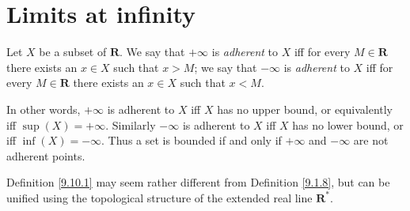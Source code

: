 \section{Limits at infinity}\label{sec 9.10}

\begin{definition}\label{9.10.1}
    Let \(X\) be a subset of \(\mathbf{R}\).
    We say that \(+\infty\) is \emph{adherent} to \(X\) iff for every \(M \in \mathbf{R}\) there exists an \(x \in X\) such that \(x > M\);
    we say that \(-\infty\) is \emph{adherent} to \(X\) iff for every \(M \in \mathbf{R}\) there exists an \(x \in X\) such that \(x < M\).
\end{definition}

\begin{note}
    In other words, \(+\infty\) is adherent to \(X\) iff \(X\) has no upper bound, or equivalently iff \(\sup(X) = +\infty\).
    Similarly \(-\infty\) is adherent to \(X\) iff \(X\) has no lower bound, or iff \(\inf(X) = -\infty\).
    Thus a set is bounded if and only if \(+\infty\) and \(-\infty\) are not adherent points.
\end{note}

\begin{remark}\label{9.10.2}
    Definition \ref{9.10.1} may seem rather different from Definition \ref{9.1.8}, but can be unified using the topological structure of the extended real line \(\mathbf{R}^*\).
\end{remark}